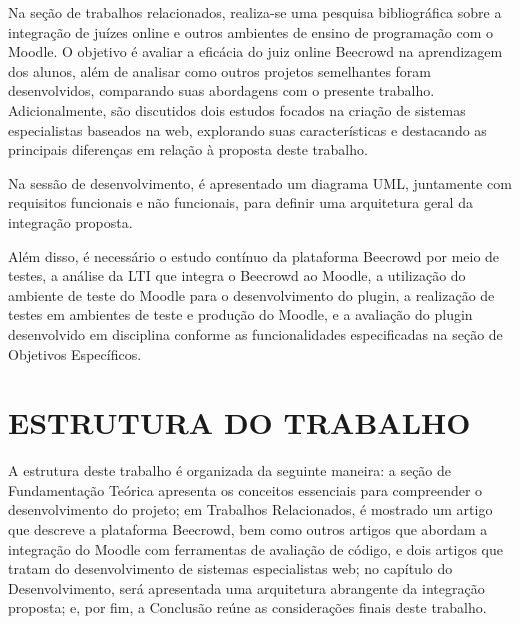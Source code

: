 Na seção de trabalhos relacionados, realiza-se uma pesquisa bibliográfica sobre a integração de juízes online e outros ambientes de ensino de programação com o Moodle. O objetivo é avaliar a eficácia do juiz online Beecrowd na aprendizagem dos alunos, além de analisar como outros projetos semelhantes foram desenvolvidos, comparando suas abordagens com o presente trabalho. Adicionalmente, são discutidos dois estudos focados na criação de sistemas especialistas baseados na web, explorando suas características e destacando as principais diferenças em relação à proposta deste trabalho.

Na sessão de desenvolvimento, é apresentado um diagrama UML, juntamente com requisitos funcionais e não funcionais, para definir uma arquitetura geral da integração proposta.

Além disso, é necessário o estudo contínuo da plataforma Beecrowd por meio de testes, a análise da LTI que integra o Beecrowd ao Moodle, a utilização do ambiente de teste do Moodle para o desenvolvimento do plugin, a realização de testes em ambientes de teste e produção do Moodle, e a avaliação do plugin desenvolvido em disciplina conforme as funcionalidades especificadas na seção de Objetivos Específicos.

\section{ESTRUTURA DO TRABALHO}

A estrutura deste trabalho é organizada da seguinte maneira: a seção de Fundamentação Teórica apresenta os conceitos essenciais para compreender o desenvolvimento do projeto; em Trabalhos Relacionados, é mostrado um artigo que descreve a plataforma Beecrowd, bem como outros artigos que abordam a integração do Moodle com ferramentas de avaliação de código, e dois artigos que tratam do desenvolvimento de sistemas especialistas web; no capítulo do Desenvolvimento, será apresentada uma arquitetura abrangente da integração proposta; e, por fim, a Conclusão reúne as considerações finais deste trabalho.

